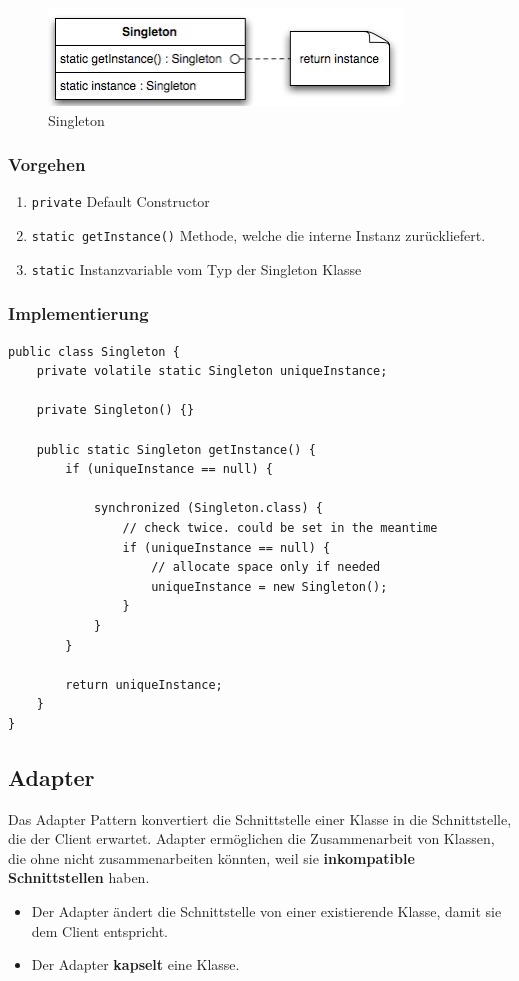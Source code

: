 \begin{figure}[h!]
	\centering
	\includegraphics[width=0.5\linewidth]{images/singleton}
	\caption{Singleton}
	\label{fig:singleton}
\end{figure}


\subsubsection{Vorgehen}
\begin{enumerate}
	\item \lstinline|private| Default Constructor
	\item \lstinline|static getInstance()| Methode, welche die interne Instanz zurückliefert.
	\item \lstinline|static| Instanzvariable vom Typ der Singleton Klasse
\end{enumerate}

\subsubsection{Implementierung}
\begin{lstlisting}
public class Singleton {
	private volatile static Singleton uniqueInstance;
	
	private Singleton() {}
	
	public static Singleton getInstance() {
		if (uniqueInstance == null) {
		
			synchronized (Singleton.class) {
				// check twice. could be set in the meantime
				if (uniqueInstance == null) {
					// allocate space only if needed
					uniqueInstance = new Singleton();
				}
			}
		}
		
		return uniqueInstance;
	}
}
\end{lstlisting}

\clearpage


\subsection{Adapter}
\label{sec:adapter}
Das Adapter Pattern konvertiert die Schnittstelle einer Klasse in die Schnittstelle, die der Client erwartet. Adapter ermöglichen die Zusammenarbeit von Klassen, die ohne nicht zusammenarbeiten könnten, weil sie \textbf{inkompatible Schnittstellen} haben.
\begin{itemize}
	\item  Der Adapter ändert die Schnittstelle von einer existierende Klasse, damit sie dem Client entspricht.
	\item Der Adapter \textbf{kapselt} eine Klasse.
\end{itemize}

